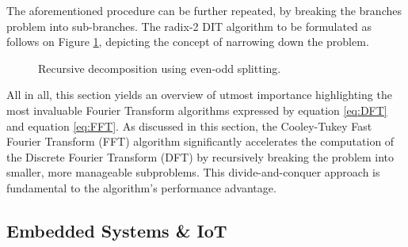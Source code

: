 {The aforementioned procedure can be further repeated, by breaking the branches problem into sub-branches. The radix-2 DIT algorithm to be formulated as follows on Figure \ref{fig:RecFFT}, depicting the concept of narrowing down the problem. 

\begin{figure}[h]
    \centering
    \caption{Recursive decomposition using even-odd splitting.}
    \label{fig:RecFFT}
\end{figure}

All in all, this section yields an overview of utmost importance highlighting the most invaluable Fourier Transform algorithms expressed by equation \eqref{eq:DFT} and equation \eqref{eq:FFT}.
As discussed in this section, the Cooley-Tukey Fast Fourier Transform (FFT) algorithm significantly accelerates the computation of the Discrete Fourier Transform (DFT) by recursively breaking the problem into smaller, more manageable subproblems. This divide-and-conquer approach is fundamental to the algorithm’s performance advantage.

}

\subsection{Embedded Systems \& IoT}
